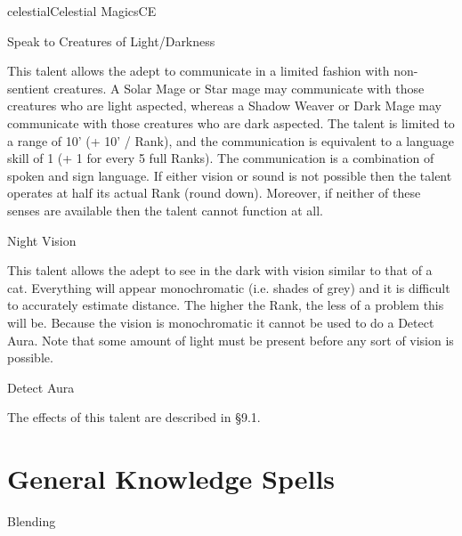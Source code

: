 \begin{College}[1.3]{celestial}{Celestial Magics}{CE}
\begin{talent}[T-1]{Speak to Creatures of Light/Darkness}
\begin{effects}
This talent allows the adept to communicate in a limited fashion with
non-sentient creatures.  A Solar Mage or Star mage may communicate
with those creatures who are light aspected, whereas a Shadow Weaver
or Dark Mage may communicate with those creatures who are dark
aspected.  The talent is limited to a range of 10’ (+ 10’ / Rank), and
the communication is equivalent to a language skill of 1 (+ 1 for
every 5 full Ranks).  The communication is a combination of spoken and
sign language.  If either vision or sound is not possible then the
talent operates at half its actual Rank (round down).  Moreover, if
neither of these senses are available then the talent cannot function
at all.
\end{effects}
\end{talent}

\begin{talent}[T-2]{Night Vision}

\begin{effects}
This talent allows the adept to see in the dark with vision similar to
that of a cat. Everything will appear monochromatic (i.e.  shades of
grey) and it is difficult to accurately estimate distance.  The higher
the Rank, the less of a problem this will be. Because the vision is
monochromatic it cannot be used to do a Detect Aura.  Note that some
amount of light must be present before any sort of vision is possible.
\end{effects}
\end{talent}

\begin{talent}[T-3]{Detect Aura}

\begin{effects}
 The effects of this talent are described in §9.1.
\end{effects}
\end{talent}


\section{General Knowledge Spells}

\begin{spell}[G-1]{Blending}


\end{spell}
\end{College}
